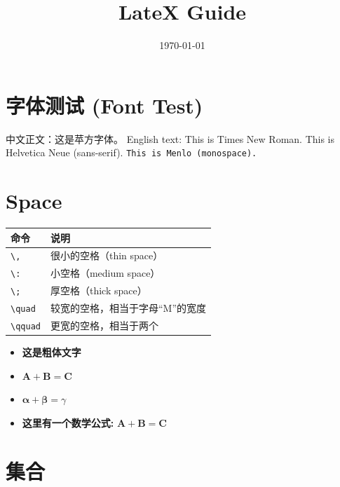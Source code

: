 \documentclass[a4paper,12pt]{article}
\begin{document}
    \title{LateX Guide}
    \date{\today}
    \maketitle
    \section*{字体测试 (Font Test)}
    中文正文：这是苹方字体。
    English text: This is Times New Roman.
    \textsf{This is Helvetica Neue (sans-serif).}
    \texttt{This is Menlo (monospace).}



    \section{Space}

    \begin{tabular}{ll}
        \toprule
        \textbf{命令}   & \textbf{说明}       \\
        \midrule
        \verb|\,|     & 很小的空格（thin space） \\
        \verb|\:|     & 小空格（medium space） \\
        \verb|\;|     & 厚空格（thick space）  \\
        \verb|\quad|  & 较宽的空格，相当于字母“M”的宽度 \\
        \verb|\qquad| & 更宽的空格，相当于两个 \quad \\
    \end{tabular}


    \begin{itemize}
        \item \textbf{这是粗体文字}
        \item $\mathbf{A} + \mathbf{B} = \mathbf{C}$
        \item $\bm{\alpha + \beta} = \gamma$
        \item \textbf{这里有一个数学公式: } $\mathbf{A + B = C}$
    \end{itemize}



    \section{集合}
\end{document}
